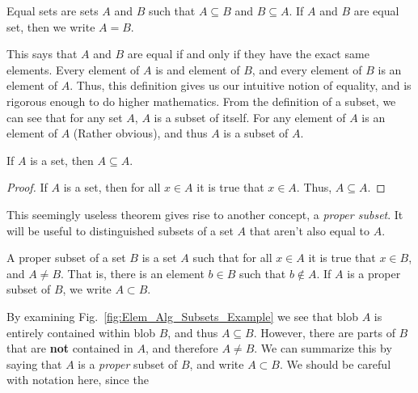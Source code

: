 \documentclass[crop=false,class=book,oneside]{standalone}
\begin{document}
            \begin{definition}
                \label{def:ELEM_ALG:Equal_Sets}
                Equal sets are sets $A$ and $B$ such that
                $A\subseteq{B}$ and $B\subseteq{A}$. If $A$ and $B$
                are equal set, then we write $A=B$.
            \end{definition}
            This says that $A$ and $B$ are equal if and only if
            they have the exact same elements. Every element of
            $A$ is and element of $B$, and every element of
            $B$ is an element of $A$. Thus, this definition gives
            us our intuitive notion of equality, and is
            rigorous enough to do higher mathematics.
            From the definition of a subset, we can see that for
            any set $A$, $A$ is a subset of itself. For any element
            of $A$ is an element of $A$ (Rather obvious), and thus
            $A$ is a subset of $A$.
            \begin{theorem}
                If $A$ is a set, then $A\subseteq{A}$.
            \end{theorem}
            \begin{proof}
                If $A$ is a set, then for all
                $x\in{A}$ it is true that $x\in{A}$.
                Thus, $A\subseteq{A}$.
            \end{proof}
            This seemingly useless theorem gives rise
            to another concept, a \textit{proper subset}.
            It will be useful to distinguished subsets
            of a set $A$ that aren't also equal to $A$.
            \begin{definition}
                A proper subset of a set $B$ is a set
                $A$ such that for all $x\in{A}$ it is
                true that $x\in{B}$, and $A\ne{B}$.
                That is, there is an element $b\in{B}$
                such that $b\notin{A}$. If $A$
                is a proper subset of $B$,
                we write $A\subset{B}$.
            \end{definition}
            By examining Fig.~\ref{fig:Elem_Alg_Subsets_Example}
            we see that blob $A$ is entirely
            contained within blob $B$, and thus
            $A\subseteq{B}$. However, there are parts of $B$
            that are \textbf{not} contained in $A$, and
            therefore $A\ne{B}$. We can summarize this by
            saying that $A$ is a \textit{proper} subset of
            $B$, and write $A\subset{B}$.
            We should be careful with notation here, since the
\end{document}

